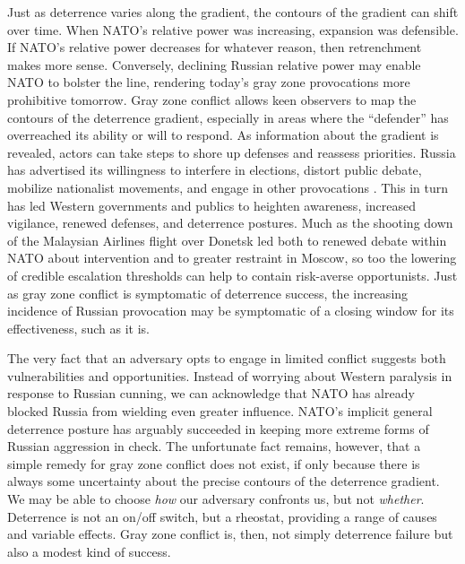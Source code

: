 \documentclass[11pt,letterpaper,pdftex,dvipsnames,table]{article}
\begin{document}
Just as deterrence varies along the gradient, the contours of the gradient can shift over time. When NATO’s relative power was increasing, expansion was defensible. If NATO’s relative power decreases for whatever reason, then retrenchment makes more sense. Conversely, declining Russian relative power may enable NATO to bolster the line, rendering today’s gray zone provocations more prohibitive tomorrow. Gray zone conflict allows keen observers to map the contours of the deterrence gradient, especially in areas where the ``defender'' has overreached its ability or will to respond. As information about the gradient is revealed, actors can take steps to shore up defenses and reassess priorities. Russia has advertised its willingness to interfere in elections, distort public debate, mobilize nationalist movements, and engage in other provocations \citep{foster_propagandagoneviral_2021}. This in turn has led Western governments and publics to heighten awareness, increased vigilance, renewed defenses, and deterrence postures. Much as the shooting down of the Malaysian Airlines flight over Donetsk led both to renewed debate within NATO about intervention and to greater restraint in Moscow, so too the lowering of credible escalation thresholds can help to contain risk-averse opportunists. Just as gray zone conflict is symptomatic of deterrence success, the increasing incidence of Russian provocation may be symptomatic of a closing window for its effectiveness, such as it is.

The very fact that an adversary opts to engage in limited conflict suggests both vulnerabilities and opportunities. Instead of worrying about Western paralysis in response to Russian cunning, we can acknowledge that NATO has already blocked Russia from wielding even greater influence. NATO's implicit general deterrence posture has arguably succeeded in keeping more extreme forms of Russian aggression in check. The unfortunate fact remains, however, that a simple remedy for gray zone conflict does not exist, if only because there is always some uncertainty about the precise contours of the deterrence gradient. We may be able to choose \textit{how} our adversary confronts us, but not \textit{whether}. Deterrence is not an on/off switch, but a rheostat, providing a range of causes and variable effects. Gray zone conflict is, then, not simply deterrence failure but also a modest kind of success.

\newpage


\end{document}
